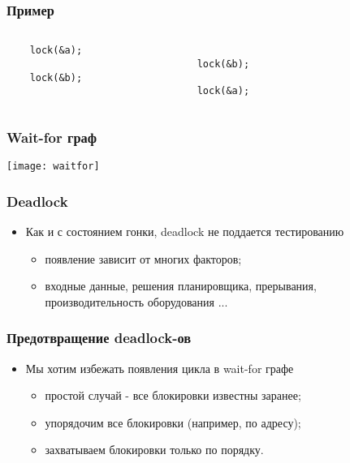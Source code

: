 \begin{frame}[fragile]
\frametitle{Пример}
\begin{columns}
    \begin{column}{.35\textwidth}
        \begin{lstlisting}
    lock(&a);

    lock(&b);

        \end{lstlisting}
    \end{column}
    \begin{column}{.35\textwidth}
        \begin{lstlisting}

    lock(&b);

    lock(&a);
        \end{lstlisting}
    \end{column}
    \begin{column}{.3\textwidth}
    \end{column}
\end{columns}
\end{frame}

\begin{frame}
\frametitle{Wait-for граф}
\texttt{[image: waitfor]}
\end{frame}

\begin{frame}
\frametitle{Deadlock}
\begin{itemize}
    \item<1->Как и с состоянием гонки, deadlock не поддается тестированию
    \begin{itemize}
        \item<2->появление зависит от многих факторов;
        \item<3->входные данные, решения планировщика, прерывания,
             производительность оборудования ...
    \end{itemize}
\end{itemize}
\end{frame}

\begin{frame}
\frametitle{Предотвращение deadlock-ов}
\begin{itemize}
    \item<1->Мы хотим избежать появления цикла в wait-for графе
    \begin{itemize}
        \item<2->простой случай - все блокировки известны заранее;
        \item<3->упорядочим все блокировки (например, по адресу);
        \item<4->захватываем блокировки только по порядку.
    \end{itemize}
\end{itemize}
\end{frame}

